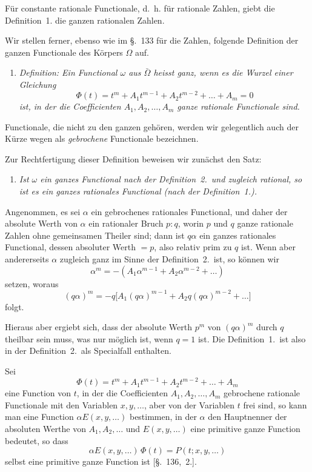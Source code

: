 \documentclass[12pt,a4paper]{article}
\theoremstyle{definition}
\begin{document}
Für constante rationale Functionale, d.~h. für rationale Zahlen, giebt die Definition~1. die ganzen rationalen Zahlen.

Wir stellen ferner, ebenso wie im \S.~133 für die Zahlen, folgende Definition der ganzen Functionale des Körpers $\Omega$ auf.

\begin{enumerate}[label=\arabic*., resume]
\item \textit{Definition: Ein Functional $\omega$ aus $\bar{\Omega}$ heisst \emph{ganz}, wenn es die Wurzel einer Gleichung}
\[
\Phi(t) = t^m + A_1t^{m-1} + A_2t^{m-2} + \dots + A_m = 0
\]
\textit{ist, in der die Coefficienten $A_1,A_2,\dots,A_m$ ganze rationale Functionale sind.}
\end{enumerate}

Functionale, die nicht zu den ganzen gehören, werden wir gelegentlich auch der Kürze wegen als \emph{gebrochene} Functionale bezeichnen.

Zur Rechtfertigung dieser Definition beweisen wir zunächst den Satz:

\begin{enumerate}[label=\arabic*., resume]
\item \textit{Ist $\omega$ ein ganzes Functional nach der Definition~2.\ und zugleich rational, so ist es ein ganzes rationales Functional (nach der Definition~1.).}
\end{enumerate}

Angenommen, es sei $\alpha$ ein gebrochenes rationales Functional, und daher der absolute Werth von $\alpha$ ein rationaler Bruch $p:q$, worin $p$ und $q$ ganze rationale Zahlen ohne gemeinsamen Theiler sind; dann ist $q\alpha$ ein ganzes rationales Functional, dessen absoluter Werth $=p$, also relativ prim zu $q$ ist. Wenn aber andererseits $\alpha$ zugleich ganz im Sinne der Definition~2.\ ist, so können wir
\[
\alpha^m = -(A_1\alpha^{m-1} + A_2\alpha^{m-2} + \dots)
\]
setzen, woraus
\[
(q\alpha)^m = -q\bigl[A_1(q\alpha)^{m-1} + A_2q(q\alpha)^{m-2} + \dots\bigr]
\]
folgt.

Hieraus aber ergiebt sich, dass der absolute Werth $p^m$ von $(q\alpha)^m$ durch $q$ theilbar sein muss, was nur möglich ist, wenn $q=1$ ist. Die Definition~1.\ ist also in der Definition~2.\ als Specialfall enthalten.

Sei
\[
\Phi(t) = t^m + A_1t^{m-1} + A_2t^{m-2} + \dots + A_m
\]
eine Function von $t$, in der die Coefficienten $A_1,A_2,\dots,A_m$ gebrochene rationale Functionale mit den Variablen $x,y,\dots$, aber von der Variablen $t$ frei sind, so kann man eine Function $\alpha E(x,y,\dots)$ bestimmen, in der $\alpha$ den Hauptnenner der absoluten Werthe von $A_1,A_2,\dots$ und $E(x,y,\dots)$ eine primitive ganze Function bedeutet, so dass
\begin{equation}\label{eq:137-1}
\alpha E(x,y,\dots)\,\Phi(t) = P(t;x,y,\dots)
\end{equation}
selbst eine primitive ganze Function ist [\S.~136,~2.].
\end{document}
